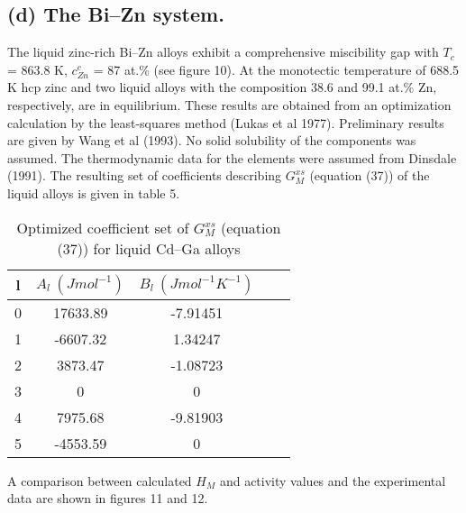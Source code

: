 \documentclass[12pt]{article}
\newcommand*{\1}{\hspace{1pt}}
\begin{document}
\subsection*{(d) The Bi–Zn system.}

The liquid zinc-rich Bi–Zn alloys exhibit a comprehensive miscibility
gap with $T _c$ = 863.8 K,  $c^{c}_{Zn}$  = 87 at.\% (see figure 10). At the monotectic temperature
of 688.5 K hcp zinc and two liquid alloys with the composition 38.6 and 99.1 at.\% Zn, 
respectively, are in equilibrium. These results are obtained from an optimization calculation
by the least-squares method (Lukas et al 1977). Preliminary results are given by Wang et al
(1993). No solid solubility of the components was assumed. The thermodynamic data for the
elements were assumed from Dinsdale (1991). The resulting set of coefficients describing $G^{xs}_M$
(equation (37)) of the liquid alloys is given in table 5.
\begin{table}[t!]
    \centering
    \caption{Optimized coefficient set of $G ^ {xs} _ {M}$ 
    (equation (37)) for liquid Cd–Ga alloys}
     \begin{tabular}{|c | c | c | c | c |} 
     \hline
     l & $A_l \ (J mol^{-1})$ & $B_l \ (J mol^{-1}K^{-1})$ \\ [0.5ex] 
     \hline\hline
     0 & 17633.89 & -7.91451  \\ 
     1 & -6607.32 & 1.34247 \\
     2 & 3873.47 & -1.08723 \\
     3 & 0 & 0\\
     4 & 7975.68 & -9.81903 \\
     5 & -4553.59 & 0 \\ [1ex] 
     \hline
     \end{tabular}
    \end{table}
A comparison between calculated $H _M$ and activity values and the experimental data are shown 
in figures 11 and 12.
\begin{adjustbox}{center,caption={Calculated (continuous curve) phase diagram using the coefficient set given in
    table 5. },label={somelabel},nofloat=figure,vspace=\bigskipamount}
\end{adjustbox}
\begin{adjustbox}{center,caption={Calculated (continuous curve) enthalpy of mixing of liquid 
    Bi–Zn alloys using the
    coefficient set given in table 5. },label={somelabel},nofloat=figure,vspace=\bigskipamount}
\end{adjustbox}
\begin{adjustbox}{center,caption={Calculated (continuous curve) activity of liquid Bi–Zn alloy at 873 K using the
    coefficient set given in table 5.  },label={somelabel},nofloat=figure,vspace=\bigskipamount}
\end{adjustbox}
\end{document}
